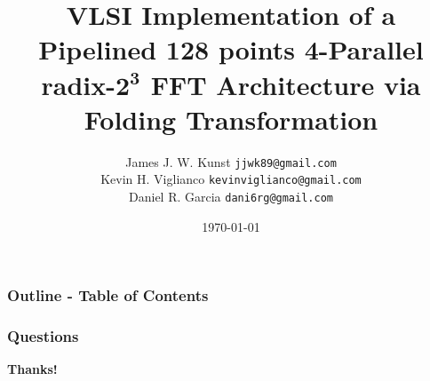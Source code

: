 \documentclass[xcolor=table,ps]{beamer}
\title[FFT Architecture via Folding Transformation]{\textbf{VLSI Implementation of a Pipelined 128 points 4-Parallel radix-$\mathbf{2^3}$ FFT Architecture via Folding Transformation}}
\author{ 			
James J. W. Kunst  {\tt\small jjwk89@gmail.com}\\		
Kevin H. Viglianco {\tt\small kevinviglianco@gmail.com}\\	 
Daniel R. Garcia   {\tt\small dani6rg@gmail.com}\\
}
\date{\today} %
\begin{document}
\begin{frame}
  \titlepage
\end{frame}



\begin{frame} 
  \frametitle{\textbf{Outline - Table of Contents}}
  \tableofcontents
\end{frame}




%
%  
%  


\begin{frame}
  \frametitle{\textbf{Questions}}
   \begin{center}
     {\Huge \textbf{Thanks!}\\}
    \end{center}
\end{frame}
\end{document}
